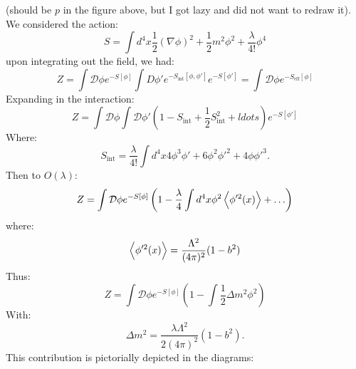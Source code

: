 (should be $p$ in the figure above, but I got lazy and did not want to redraw it). We considered the action:
\begin{equation}
    S = \int d^4x \frac{1}{2}(\nabla \phi)^2 + \frac{1}{2}m^2\phi^2 + \frac{\lambda}{4!}\phi^4
\end{equation}
upon integrating out the field, we had:
\begin{equation}
    Z = \int \mathcal{D}\phi e^{-S[\phi]}\int D\phi' e^{-S_{\text{int}}[\phi, \phi']}e^{-S[\phi']} = \int \mathcal{D}\phi e^{-S_{\text{eff}}[\phi]}
\end{equation}
Expanding in the interaction:
\begin{equation}
    Z = \int \mathcal{D}\phi \int \mathcal{D}\phi' (1 - S_{\text{int}} + \frac{1}{2}S_{\text{int}}^2 + ldots)e^{-S[\phi']}
\end{equation}
Where:
\begin{equation}
    S_{\text{int}} = \frac{\lambda}{4!}\int d^4x 4\phi^3\phi' + 6\phi^2\phi'^2 + 4\phi\phi'^3.
\end{equation}
Then to $O(\lambda)$:
\begin{equation}
    Z = \int \mathcal{D}\phi e^{-S[\phi]}\left(1 - \frac{\lambda}{4}\int d^4x \phi^2 \left< \phi'^2(x) \right> + \ldots\right)
\end{equation}
where:
\begin{equation}
    \left< \phi'^2(x) \right> = \frac{\Lambda^2}{(4\pi)^2}(1 - b^2)
\end{equation}
Thus:
\begin{equation}
    Z = \int \mathcal{D}\phi e^{-S[\phi]}\left(1 - \int \frac{1}{2}\Delta m^2 \phi^2\right)
\end{equation}
With:
\begin{equation}
    \Delta m^2 = \frac{\lambda\Lambda^2}{2(4\pi)^2}(1 - b^2).
\end{equation}
This contribution is pictorially depicted in the diagrams:

